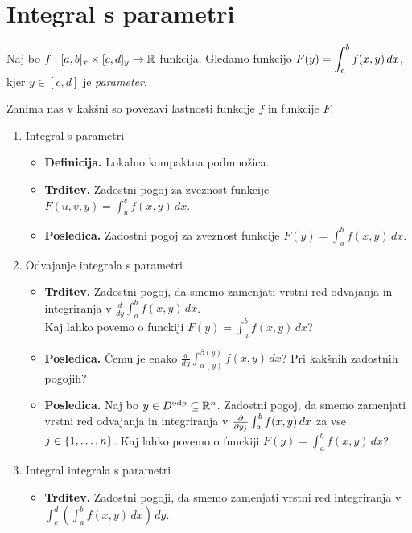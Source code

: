 \section{Integral s parametri}
Naj bo $f:[a,b]_x \times [c,d]_y \to \mathbb{R}$ funkcija. Gledamo funkcijo $\displaystyle F(y) = \int_{a}^{b}f(x,y) \, dx$, kjer $y \in [c,d]$ je \emph{parameter}.

Zanima nas v kakšni so povezavi lastnosti funkcije $f$ in funkcije $F$.

\begin{enumerate}
    \item Integral s parametri
    \begin{itemize}
        \item \colorbox{purple!30}{\textbf{Definicija.}} Lokalno kompaktna podmnožica.
        \item \colorbox{blue!30}{\textbf{Trditev.}} Zadostni pogoj za zveznost funkcije $F(u,v,y) = \int_{u}^{v}f(x,y) \, dx$.
        \item \colorbox{orange!30}{\textbf{Posledica.}} Zadostni pogoj za zveznost funkcije $F(y) = \int_{a}^{b}f(x,y) \, dx$.
    \end{itemize}
    \item Odvajanje integrala s parametri
    \begin{itemize}
        \item \colorbox{blue!30}{\textbf{Trditev.}} Zadostni pogoj, da smemo zamenjati vrstni red odvajanja in integriranja v \(\frac{d}{dy} \int_{a}^{b}f(x,y) \, dx\). \\ Kaj lahko povemo o funckiji $F(y) = \int_{a}^{b}f(x,y) \, dx$?
        \item \colorbox{orange!30}{\textbf{Posledica.}} Čemu je enako \(\frac{d}{dy} \int_{\alpha(y)}^{\beta(y)}f(x,y) \, dx\)? Pri kakšnih zadostnih pogojih?
        \item \colorbox{orange!30}{\textbf{Posledica.}} Naj bo \(y \in D^\text{odp} \subseteq \mathbb{R}^n\). Zadostni pogoj, da smemo zamenjati vrstni red odvajanja in integriranja v \(\frac{\partial }{\partial y_j} \int_{a}^{b}f(x,y) \, dx\) za vse \(j \in \left\{1, \ldots, n\right\}\).  Kaj lahko povemo o funckiji $F(y) = \int_{a}^{b}f(x,y) \, dx$?
    \end{itemize}

    \item Integral integrala s parametri
    \begin{itemize}
        \item \colorbox{blue!30}{\textbf{Trditev.}} Zadostni pogoji, da smemo zamenjati vrstni red integriranja v \(\int_{c}^{d} \left(\int_{a}^{b} f(x,y) \,dx \right) \,dy\).
    \end{itemize}


\end{enumerate}
